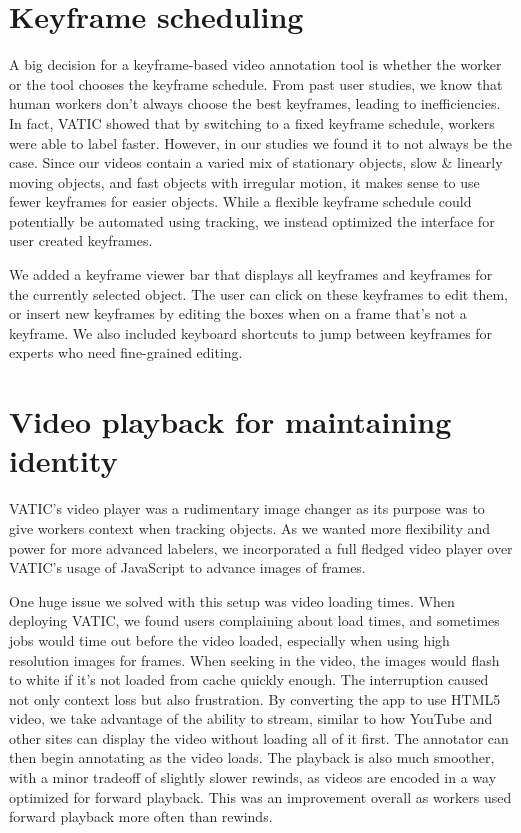 \section{Keyframe scheduling}

A big decision for a keyframe-based video annotation tool is whether the worker or the tool chooses the keyframe schedule.
From past user studies, we know that human workers don't always choose the best keyframes, leading to inefficiencies.
In fact, VATIC showed that by switching to a fixed keyframe schedule, workers were able to label faster.
However, in our studies we found it to not always be the case.
Since our videos contain a varied mix of stationary objects, slow \& linearly moving objects, and fast objects with irregular motion, it makes sense to use fewer keyframes for easier objects.
While a flexible keyframe schedule could potentially be automated using tracking, we instead optimized the interface for user created keyframes.

We added a keyframe viewer bar that displays all keyframes and keyframes for the currently selected object.
The user can click on these keyframes to edit them, or insert new keyframes by editing the boxes when on a frame that's not a keyframe.
We also included keyboard shortcuts to jump between keyframes for experts who need fine-grained editing.

\section{Video playback for maintaining identity}

VATIC's video player was a rudimentary image changer as its purpose was to give workers context when tracking objects.
As we wanted more flexibility and power for more advanced labelers, we incorporated a full fledged video player over VATIC's usage of JavaScript to advance images of frames.

One huge issue we solved with this setup was video loading times.
When deploying VATIC, we found users complaining about load times, and sometimes jobs would time out before the video loaded, especially when using high resolution images for frames.
When seeking in the video, the images would flash to white if it's not loaded from cache quickly enough.
The interruption caused not only context loss but also frustration.
By converting the app to use HTML5 video, we take advantage of the ability to stream, similar to how YouTube and other sites can display the video without loading all of it first.
The annotator can then begin annotating as the video loads.
The playback is also much smoother, with a minor tradeoff of slightly slower rewinds, as videos are encoded in a way optimized for forward playback.
This was an improvement overall as workers used forward playback more often than rewinds.

